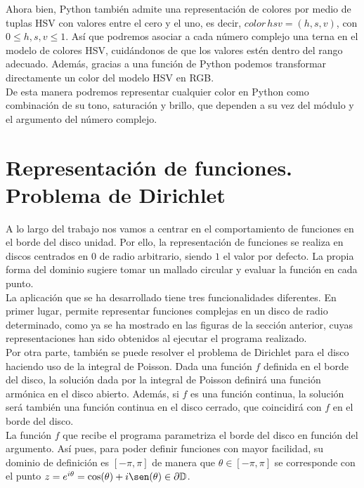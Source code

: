Ahora bien, Python también admite una representación de colores por medio de tuplas HSV con valores entre el cero y el uno, es decir, $color \, hsv = (h, s, v)$, con $0 \leq h, s, v \leq 1$. Así que podremos asociar a cada número complejo una terna en el modelo de colores HSV, cuidándonos de que los valores estén dentro del rango adecuado. Además, gracias a una función de Python podemos transformar directamente un color del modelo HSV en RGB. \\

De esta manera podremos representar cualquier color en Python como combinación de su tono, saturación y brillo, que dependen a su vez del módulo y el argumento del número complejo. \\

\section{Representación de funciones. Problema de Dirichlet}

A lo largo del trabajo nos vamos a centrar en el comportamiento de funciones en el borde del disco unidad. Por ello, la representación de funciones se realiza en discos centrados en $0$ de radio arbitrario, siendo $1$ el valor por defecto. La propia forma del dominio sugiere tomar un mallado circular y evaluar la función en cada punto. \\

La aplicación que se ha desarrollado tiene tres funcionalidades diferentes. En primer lugar, permite representar funciones complejas en un disco de radio determinado, como ya se ha mostrado en las figuras de la sección anterior, cuyas representaciones han sido obtenidos al ejecutar el programa realizado. \\

Por otra parte, también se puede resolver el problema de Dirichlet para el disco haciendo uso de la integral de Poisson. Dada una función $f$ definida en el borde del disco, la solución dada por la integral de Poisson definirá una función armónica en el disco abierto. Además, si $f$ es una función continua, la solución será también una función continua en el disco cerrado, que coincidirá con $f$ en el borde del disco. \\

La función $f$ que recibe el programa parametriza el borde del disco en función del argumento. Así pues, para poder definir funciones con mayor facilidad, su dominio de definición es $[-\pi, \pi]$ de manera que $\theta \in [-\pi, \pi]$ se corresponde con el punto $z = e^{i \theta} = \cos(\theta) + i \sen(\theta) \in \partial \disk$. \\

